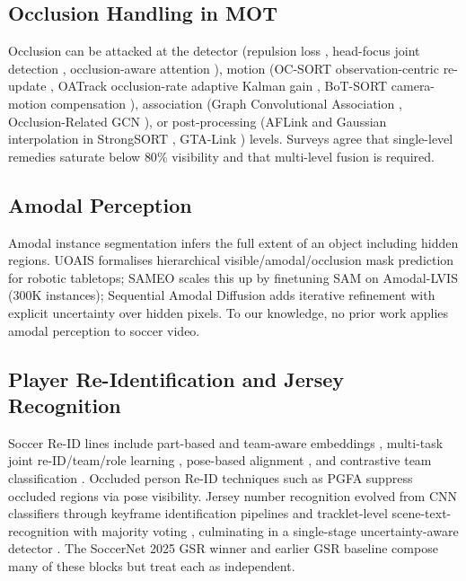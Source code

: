 \documentclass[conference]{IEEEtran}
\begin{document}
\subsection{Occlusion Handling in MOT}
Occlusion can be attacked at the detector (repulsion loss \cite{repulsionloss}, head-focus joint detection \cite{headfocus}, occlusion-aware attention \cite{occattention}), motion (OC-SORT observation-centric re-update \cite{ocsort}, OATrack occlusion-rate adaptive Kalman gain \cite{oatrack}, BoT-SORT camera-motion compensation \cite{botsort}), association (Graph Convolutional Association \cite{gcnassoc}, Occlusion-Related GCN \cite{occgcn}), or post-processing (AFLink and Gaussian interpolation in StrongSORT \cite{strongsort}, GTA-Link \cite{gtatrack}) levels. Surveys \cite{occreview, pedoccreview} agree that single-level remedies saturate below $80\%$ visibility and that multi-level fusion is required.

\subsection{Amodal Perception}
Amodal instance segmentation infers the full extent of an object including hidden regions. UOAIS \cite{uoais} formalises hierarchical visible/amodal/occlusion mask prediction for robotic tabletops; SAMEO \cite{sameo} scales this up by finetuning SAM on Amodal-LVIS (300K instances); Sequential Amodal Diffusion \cite{seqamodaldiff} adds iterative refinement with explicit uncertainty over hidden pixels. To our knowledge, no prior work applies amodal perception to soccer video.

\subsection{Player Re-Identification and Jersey Recognition}
Soccer Re-ID lines include part-based and team-aware embeddings \cite{sportsreid}, multi-task joint re-ID/team/role learning \cite{multitaskreid}, pose-based alignment \cite{posebroadcast}, and contrastive team classification \cite{contrastiveteam}. Occluded person Re-ID techniques such as PGFA \cite{pgfa} suppress occluded regions via pose visibility. Jersey number recognition evolved from CNN classifiers \cite{posejersey} through keyframe identification pipelines \cite{keyframejersey} and tracklet-level scene-text-recognition with majority voting \cite{soccernetjersey}, culminating in a single-stage uncertainty-aware detector \cite{uncertaintyjersey}. The SoccerNet 2025 GSR winner \cite{gsr2025winner} and earlier GSR baseline \cite{somers2024gsr} compose many of these blocks but treat each as independent.
\end{document}

